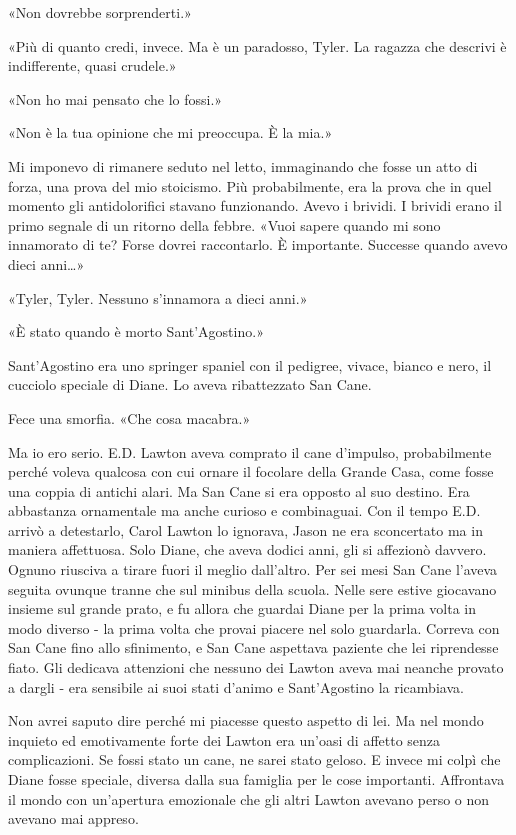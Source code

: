 «Non dovrebbe sorprenderti.»

«Più di quanto credi, invece. Ma è un paradosso, Tyler. La ragazza che
descrivi è indifferente, quasi crudele.»

«Non ho mai pensato che lo fossi.»

«Non è la tua opinione che mi preoccupa. È la mia.»

Mi imponevo di rimanere seduto nel letto, immaginando che fosse un atto
di forza, una prova del mio stoicismo. Più probabilmente, era la prova
che in quel momento gli antidolorifici stavano funzionando. Avevo i
brividi. I brividi erano il primo segnale di un ritorno della febbre.
«Vuoi sapere quando mi sono innamorato di te? Forse dovrei raccontarlo.
È importante. Successe quando avevo dieci anni\ldots»

«Tyler, Tyler. Nessuno s'innamora a dieci anni.»

«È stato quando è morto Sant'Agostino.»

Sant'Agostino era uno springer spaniel con il pedigree, vivace, bianco e
nero, il cucciolo speciale di Diane. Lo aveva ribattezzato San Cane.

Fece una smorfia. «Che cosa macabra.»

Ma io ero serio. E.D. Lawton aveva comprato il cane d'impulso,
probabilmente perché voleva qualcosa con cui ornare il focolare della
Grande Casa, come fosse una coppia di antichi alari. Ma San Cane si era
opposto al suo destino. Era abbastanza ornamentale ma anche curioso e
combinaguai. Con il tempo E.D. arrivò a detestarlo, Carol Lawton lo
ignorava, Jason ne era sconcertato ma in maniera affettuosa. Solo Diane,
che aveva dodici anni, gli si affezionò davvero. Ognuno riusciva a
tirare fuori il meglio dall'altro. Per sei mesi San Cane l'aveva seguita
ovunque tranne che sul minibus della scuola. Nelle sere estive giocavano
insieme sul grande prato, e fu allora che guardai Diane per la prima
volta in modo diverso - la prima volta che provai piacere nel solo
guardarla. Correva con San Cane fino allo sfinimento, e San Cane
aspettava paziente che lei riprendesse fiato. Gli dedicava attenzioni
che nessuno dei Lawton aveva mai neanche provato a dargli - era
sensibile ai suoi stati d'animo e Sant'Agostino la ricambiava.

Non avrei saputo dire perché mi piacesse questo aspetto di lei. Ma nel
mondo inquieto ed emotivamente forte dei Lawton era un'oasi di affetto
senza complicazioni. Se fossi stato un cane, ne sarei stato geloso. E
invece mi colpì che Diane fosse speciale, diversa dalla sua famiglia per
le cose importanti. Affrontava il mondo con un'apertura emozionale che
gli altri Lawton avevano perso o non avevano mai appreso.

